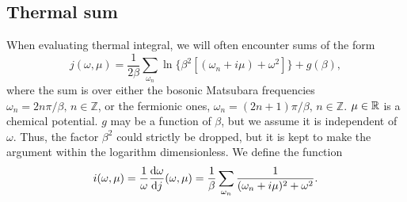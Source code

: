 \subsection{Thermal sum}
\label{section: thermal sum}

When evaluating thermal integral, we will often encounter sums of the form
%
\begin{equation}
    \label{j func}
    j(\omega, \mu) = \frac{1}{2\beta} \sum_{\omega_n} 
    \ln\{\beta^2 [(\omega_n + i \mu) + \omega^2] \} + g(\beta),
\end{equation}
%
where the sum is over either the bosonic Matsubara frequencies $\omega_n = 2n \pi / \beta,\, n \in \mathbb{Z}$, or the fermionic ones, $\omega_n = (2n + 1) \pi /\beta ,\, n \in \mathbb{Z}$.
$\mu \in \mathbb{R}$ is a chemical potential.
$g$ may be a function of $\beta$, but we assume it is independent of $\omega$.
Thus, the factor $\beta^2$ could strictly be dropped, but it is kept to make the argument within the logarithm dimensionless.
We define the function
%
\begin{equation}
    \label{i func}
    i(\omega, \mu) = \frac{1}{\omega} \odv{\omega} j(\omega, \mu) 
    = \frac{1}{\beta} \sum_{\omega_n} \frac{1}{(\omega_n + i\mu)^2 + \omega^2}. 
\end{equation}

